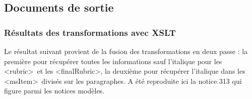\documentclass[a4paper,12pt,twoside]{book}
\begin{document}
	\subsection{Documents de sortie}
	
	\subsubsection{\label{resultats_XSLT}Résultats des transformations avec XSLT}
	
	Le résultat suivant provient de la fusion des transformations en deux passe : la première pour récupérer toutes les informations sauf l'italique pour les \textless rubric\textgreater~et les \textless finalRubric\textgreater, la deuxième pour récupérer l'italique dans les \textless msItem\textgreater~divisés sur les paragraphes. A été reproduite ici la notice 313 qui figure parmi les notices modèles. 
	
\end{document}

